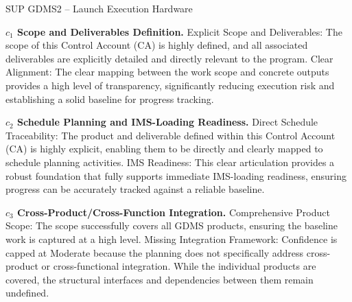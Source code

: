 \begin{frame}{SUP GDMS2 – Launch Execution Hardware}
\begin{minipage}{0.90\textwidth}
\raggedright
\fontsize{8}{9.5}\selectfont
\textbf{\(c_1\) Scope and Deliverables Definition.}
Explicit Scope and Deliverables: The scope of this Control Account (CA) is highly defined, and all associated deliverables are explicitly detailed and directly relevant to the program. Clear Alignment: The clear mapping between the work scope and concrete outputs provides a high level of transparency, significantly reducing execution risk and establishing a solid baseline for progress tracking.\par\vspace{0.6em}
\textbf{\(c_2\) Schedule Planning and IMS-Loading Readiness.}
Direct Schedule Traceability: The product and deliverable defined within this Control Account (CA) is highly explicit, enabling them to be directly and clearly mapped to schedule planning activities. IMS Readiness: This clear articulation provides a robust foundation that fully supports immediate IMS-loading readiness, ensuring progress can be accurately tracked against a reliable baseline.\par\vspace{0.6em}
\textbf{\(c_3\) Cross-Product/Cross-Function Integration.}
Comprehensive Product Scope: The scope successfully covers all GDMS products, ensuring the baseline work is captured at a high level. Missing Integration Framework: Confidence is capped at Moderate because the planning does not specifically address cross-product or cross-functional integration. While the individual products are covered, the structural interfaces and dependencies between them remain undefined.\par\vspace{0.6em}
\end{minipage}
\end{frame}

\endinput
